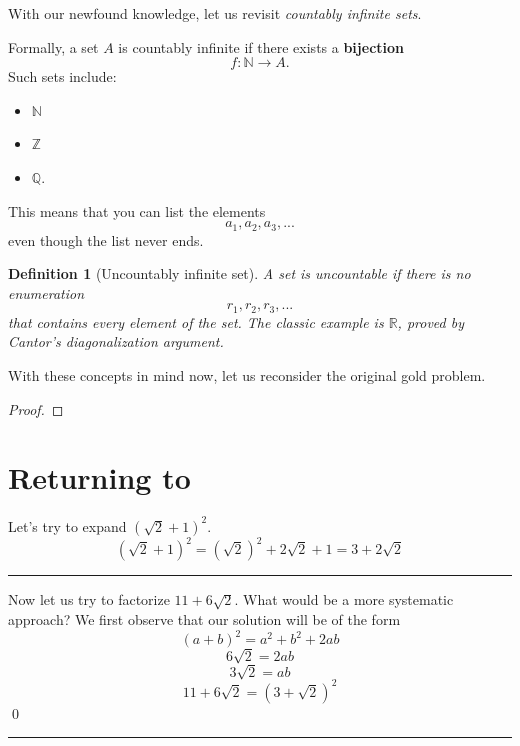 \documentclass{article}
\newtheorem*{definition}{Definition}
\begin{document}
    
With our newfound knowledge, let us revisit \emph{countably infinite sets}.

    Formally, a set $A$ is countably infinite if there exists a \textbf{bijection}
    \[
    f: \mathbb{N} \rightarrow A.
    \]
    Such sets include:
    \begin{itemize}
        \item $\mathbb{N}$
        \item $\mathbb{Z}$
        \item $\mathbb{Q}$.
    \end{itemize}
    This means that you can list the elements
    \[
    a_1, a_2, a_3,...
    \]
    even though the list never ends.

\begin{definition}[Uncountably infinite set]
    A set is uncountable if there is no enumeration
    \[
    r_1, r_2, r_3,...
    \]
    that contains every element of the set. 
    The classic example is $\mathbb{R}$, proved by Cantor's diagonalization argument.
\end{definition}


With these concepts in mind now, let us reconsider the original gold problem.

\begin{proof}
\end{proof}

\section{Returning to }
Let's try to expand $(\sqrt{2} + 1)^2$.
\[
    (\sqrt{2}+1)^2 = (\sqrt{2})^2 + 2\sqrt{2} + 1 = 3 + 2\sqrt{2}
\]

\hrule
\vspace{10pt}

Now let us try to factorize $11 + 6\sqrt{2}$.
What would be a more systematic approach?
We first observe that our solution will be of the form
\[
    (a+b)^2 = a^2 + b^2 + 2ab
\]
\[
    6\sqrt{2} = 2ab
\]
\[
    3\sqrt{2} = ab
\]
\[
    11 + 6\sqrt{2} = (3 + \sqrt{2})^2
\] \qed

\vspace{10pt}
\hrule
\vspace{10pt}
\end{document}
